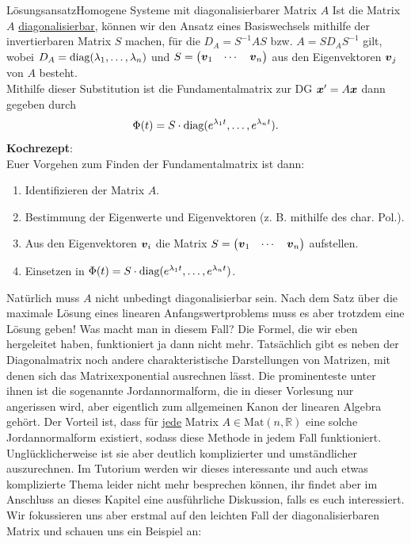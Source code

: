 \begin{Satz}
{Lösungsansatz}{Homogene Systeme mit diagonalisierbarer Matrix $A$}
Ist die Matrix $A$ \underline{diagonalisierbar}, können wir den Ansatz eines Basiswechsels mithilfe der invertierbaren Matrix $S$ machen, für die $D_A=S^{-1}AS$ bzw. $A=SD_AS^{-1}$ gilt, wobei $D_A=\text{diag}(\lambda_1,\ldots,\lambda_n)$ und $S=\begin{pmatrix}{{\text{\boldmath${v}$}}}_1&\cdots&{{\text{\boldmath${v}$}}}_n\end{pmatrix}$ aus den Eigenvektoren ${{\text{\boldmath${v}$}}}_j$ von $A$ besteht.\\
Mithilfe dieser Substitution ist die Fundamentalmatrix zur DG ${{\text{\boldmath${x}$}}}'=A{{\text{\boldmath${x}$}}}$ dann gegeben durch
\begin{equation*}
    \Phi(t)=S\cdot\text{diag}(e^{\lambda_1t},\ldots,e^{\lambda_n t}).
\end{equation*}
\textbf{Kochrezept}:\\
Euer Vorgehen zum Finden der Fundamentalmatrix ist dann:
\begin{enumerate}
    \item Identifizieren der Matrix $A$.
    \item Bestimmung der Eigenwerte und Eigenvektoren (z. B. mithilfe des char. Pol.).
    \item Aus den Eigenvektoren ${{\text{\boldmath${v}$}}}_i$ die Matrix $S=\begin{pmatrix}{{\text{\boldmath${v}$}}}_1&\cdots&{{\text{\boldmath${v}$}}}_n\end{pmatrix}$ aufstellen.
    \item Einsetzen in $\Phi(t)=S\cdot\text{diag}(e^{\lambda_1t},\ldots,e^{\lambda_n t})$.
\end{enumerate}
\end{Satz}
Natürlich muss $A$ nicht unbedingt diagonalisierbar sein. Nach dem Satz über die maximale Lösung eines linearen Anfangswertproblems muss es aber trotzdem eine Lösung geben! Was macht man in diesem Fall? Die Formel, die wir eben hergeleitet haben, funktioniert ja dann nicht mehr. Tatsächlich gibt es neben der Diagonalmatrix noch andere charakteristische Darstellungen von Matrizen, mit denen sich das Matrixexponential ausrechnen lässt. Die prominenteste unter ihnen ist die sogenannte Jordannormalform, die in dieser Vorlesung nur angerissen wird, aber eigentlich zum allgemeinen Kanon der linearen Algebra gehört. Der Vorteil ist, dass für \underline{jede} Matrix $A\in\text{Mat}(n,\mathbb{R})$ eine solche Jordannormalform existiert, sodass diese Methode in jedem Fall funktioniert. Unglücklicherweise ist sie aber deutlich komplizierter und umständlicher auszurechnen. Im Tutorium werden wir dieses interessante und auch etwas komplizierte Thema leider nicht mehr besprechen können, ihr findet aber im Anschluss an dieses Kapitel eine ausführliche Diskussion, falls es euch interessiert. \\
Wir fokussieren uns aber erstmal auf den \glqq{}leichten\grqq{} Fall der diagonalisierbaren Matrix und schauen uns ein Beispiel an:

